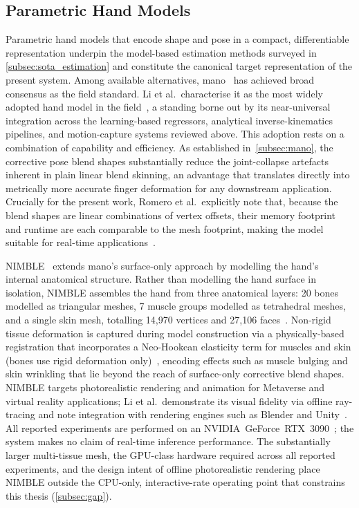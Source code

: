 \subsection{Parametric Hand Models}\label{subsec:sota_parametric}

Parametric hand models that encode shape and pose in a compact,
differentiable representation underpin the model-based estimation methods
surveyed in \autoref{subsec:sota_estimation} and constitute the canonical
target representation of the present system.
Among available alternatives, \acrshort{mano}~\cite{MANO:SIGGRAPHASIA:2017}
has achieved broad consensus as the field standard.
Li et al.\ characterise it as the most widely adopted hand model in the
field~\cite{zhang2022nimble}, a standing borne out by its near-universal
integration across the learning-based regressors, analytical
inverse-kinematics pipelines, and motion-capture systems reviewed above.
This adoption rests on a combination of capability and efficiency.
As established in~\autoref{subsec:mano}, the corrective pose blend shapes
substantially reduce the joint-collapse artefacts inherent in plain linear
blend skinning, an advantage that translates directly into metrically
more accurate finger deformation for any downstream application.
Crucially for the present work, Romero et al.\ explicitly note that, because
the blend shapes are linear combinations of vertex offsets, their memory
footprint and runtime are each comparable to the mesh footprint, making
the model suitable for real-time
applications~\cite{MANO:SIGGRAPHASIA:2017}.

NIMBLE~\cite{zhang2022nimble} extends \acrshort{mano}'s surface-only
approach by modelling the hand's internal anatomical structure.
Rather than modelling the hand surface in isolation, NIMBLE assembles the hand
from three anatomical layers: 20 bones modelled as triangular meshes, 7 muscle
groups modelled as tetrahedral meshes, and a single skin mesh, totalling
14{,}970 vertices and 27{,}106 faces~\cite{zhang2022nimble}.
Non-rigid tissue deformation is captured during model construction via a
physically-based registration that incorporates a Neo-Hookean elasticity
term for muscles and skin (bones use rigid deformation only)~\cite{zhang2022nimble},
encoding effects such as muscle bulging and skin wrinkling that lie beyond
the reach of surface-only corrective blend shapes.
NIMBLE targets photorealistic rendering and animation for Metaverse and
virtual reality applications; Li et al.\ demonstrate its visual fidelity
via offline ray-tracing and note integration with rendering engines such
as Blender and Unity~\cite{zhang2022nimble}.
All reported experiments are performed on an
\mbox{NVIDIA GeForce RTX 3090}~\cite{zhang2022nimble}; the system makes no
claim of real-time inference performance.
The substantially larger multi-tissue mesh, the GPU-class hardware required
across all reported experiments, and the design intent of offline photorealistic
rendering place NIMBLE outside the CPU-only, interactive-rate operating point
that constrains this thesis (\autoref{subsec:gap}).

